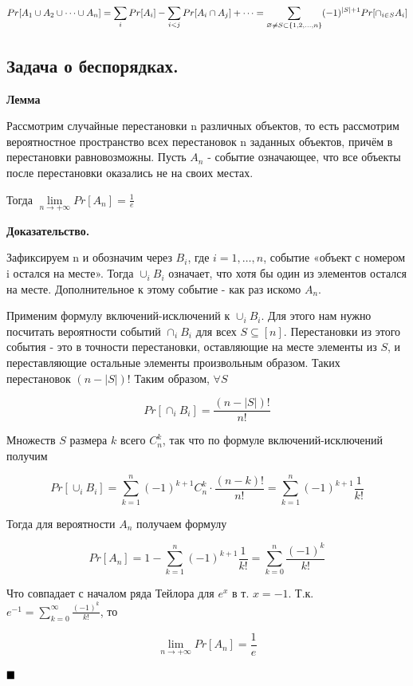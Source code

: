 \documentclass[a4paper, 10pt]{article}
\begin{document}
$$\Huge Pr[A_1 \cup A_2 \cup \dots \cup A_n] = \sum_i Pr[A_i] - \sum_{i < j} Pr[A_i \cap A_j] + \dots = \sum_{\varnothing \neq S \subset \{1, 2, \dots, n\}} (-1)^{|S| + 1} Pr[\cap_{i \in S} A_i]$$

\subsection{Задача о беспорядках.}

\textbf{Лемма}

Рассмотрим случайные перестановки n различных объектов, то есть рассмотрим вероятностное пространство всех перестановок n заданных объектов, причём в перестановки равновозможны. Пусть $A_n$ - событие означающее, что все объекты после перестановки оказались не на своих местах.

Тогда $\lim \limits_{n \to +\infty} Pr[A_n] = \frac{1}{e}$

\textbf{Доказательство.}

Зафиксируем n и обозначим через $B_i$, где $i = 1, \dots, n$, событие «объект с номером i остался на месте». Тогда $\cup_{i} B_i$ означает, что хотя бы один из элементов остался на месте. Дополнительное к этому событие - как раз искомо $A_n$.

Применим формулу включений-исключений к $\cup_{i} B_i$. Для этого нам нужно посчитать вероятности событий $\cap_{i} B_i$ для всех $S \subseteq [n]$. Перестановки из этого события - это в точности перестановки, оставляющие на месте элементы из $S$, и переставляющие остальные элементы произвольным образом. Таких перестановок $(n - |S|)!$ Таким образом, $\forall S$

$$Pr[\cap_{i} B_i] = \frac{(n - |S|)!}{n!}$$

Множеств $S$ размера $k$ всего $C_n^k$, так что по формуле включений-исключений получим

$$Pr[\cup_{i} B_i] = \sum_{k = 1}^n (-1)^{k + 1} C_n^k \cdot \frac{(n - k)!}{n!} = \sum_{k = 1}^n (-1)^{k + 1} \frac{1}{k!}$$

Тогда для вероятности $A_n$ получаем формулу

$$Pr[A_n] = 1 - \sum_{k = 1}^n (-1)^{k + 1} \frac{1}{k!} = \sum_{k = 0}^n \frac{(-1)^k}{k!}$$

Что совпадает с началом ряда Тейлора для $e^x$ в т. $x = -1$. Т.к. $e^{-1} = \sum_{k=0}^\infty \frac{(-1)^k}{k!}$, то

$$\lim \limits_{n \to +\infty} Pr[A_n] = \frac{1}{e}$$

$\hfill \blacksquare$
\end{document}
